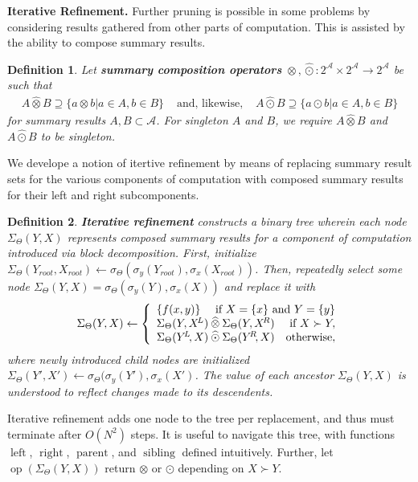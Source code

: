 \documentclass{article}
\newtheorem{definition} {Definition}
\newcommand{\GNP}[1][\psi]{{#1}_{\Theta}}
\newcommand{\otimeshat}{\mathbin{\widehat{\otimes}}}
\newcommand{\odothat}{\mathbin{\widehat{\odot}}}
\DeclareMathOperator{\leftchild}{left}
\DeclareMathOperator{\rightchild}{right}
\DeclareMathOperator{\parent}{parent}
\DeclareMathOperator{\sibling}{sibling}
\DeclareMathOperator{\op}{op}
\begin{document}
{\bf Iterative Refinement.}  Further pruning is possible in some
problems by considering results gathered from other parts of
computation.  This is assisted by the ability to compose summary
results.
\begin{definition}
  Let {\bf summary composition operators} $\otimeshat, \odothat \colon
  2^{\mathcal{A}} \times 2^{\mathcal{A}} \to 2^{\mathcal{A}}$ be such
  that
  \[ \begin{array}{rcl}
    A \otimeshat B \supseteq \{a \otimes b | a \in A, b \in B\} & \mbox{ and, likewise, } & A \odothat B \supseteq \{a \odot b | a \in A, b \in B\}
  \end{array} \]
  for summary results $A,B \subset \mathcal{A}$.  For singleton $A$
  and $B$, we require $A \otimeshat B$ and $A \odothat B$ to be
  singleton.
\end{definition}
\noindent We develope a notion of itertive refinement by means of
replacing summary result sets for the various components of
computation with composed summary results for their left and right
subcomponents.
\begin{definition}
  {\bf Iterative refinement} constructs a binary tree wherein each
  node $\GNP[\Sigma](Y,X)$ represents composed summary results for a
  component of computation introduced via block decomposition.  First,
  initialize $\GNP[\Sigma](Y_{root},X_{root}) \gets
  \GNP[\sigma](\sigma_y(Y_{root}),\sigma_x(X_{root}))$.  Then,
  repeatedly select some node $\GNP[\Sigma](Y,X) =
  \GNP[\sigma](\sigma_y(Y),\sigma_x(X))$ and replace it with
  \[
  \GNP[\Sigma](Y,X) \gets \left\{ \begin{array}{lrr}
    \{f(x,y)\} & \multicolumn{2}{r}{\mbox{\rm if } X = \{x\} \mbox{ \rm and } Y = \{y\}} \\
    \multicolumn{2}{l}{\GNP[\Sigma](Y,X^{\!L}) \otimeshat \GNP[\Sigma](Y,X^{\!R})} & \mbox{\rm if } X \succ Y, \\
    \multicolumn{2}{l}{\GNP[\Sigma](Y^{\!L}\!,X) \odothat \GNP[\Sigma](Y^{\!R}\!,X)} & \mbox{\rm otherwise},
  \end{array} \right.
  \]
  where newly introduced child nodes are initialized
  $\GNP[\Sigma](Y',X') \gets \GNP[\sigma](\sigma_y(Y'),\sigma_x(X')$.
  The value of each ancestor $\GNP[\Sigma](Y,X)$ is understood to
  reflect changes made to its descendents.
\end{definition}
\noindent Iterative refinement adds one node to the tree per
replacement, and thus must terminate after $O(N^2)$ steps.  It is
useful to navigate this tree, with functions $\leftchild$,
$\rightchild$, $\parent$, and $\sibling$ defined intuitively.
Further, let $\op(\GNP[\Sigma](Y,X))$ return $\otimes$ or $\odot$
depending on $X \succ Y$.
\end{document}
